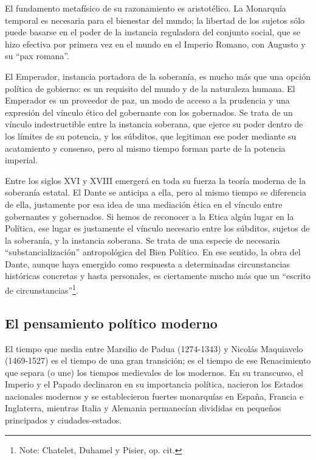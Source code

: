 \documentclass[
]{book}
\begin{document}
El fundamento metafísico de su razonamiento es aristotélico. La Monarquía temporal es necesaria para el bienestar del mundo; la libertad de los sujetos sólo puede basarse en el poder de la instancia reguladora del conjunto social, que se hizo efectiva por primera vez en el mundo en el Imperio Romano, con Augusto y su ``pax romana''.

El Emperador, instancia portadora de la soberanía, es mucho más que una opción política de gobierno: es un requisito del mundo y de la naturaleza humana. El Emperador es un proveedor de paz, un modo de acceso a la prudencia y una expresión del vínculo ético del gobernante con los gobernados. Se trata de un vínculo indestructible entre la instancia soberana, que ejerce su poder dentro de los límites de su potencia, y los súbditos, que legitiman ese poder mediante su acatamiento y consenso, pero al mismo tiempo forman parte de la potencia imperial.

Entre los siglos XVI y XVIII emergerá en toda su fuerza la teoría moderna de la soberanía estatal. El Dante se anticipa a ella, pero al mismo tiempo se diferencia de ella, justamente por esa idea de una mediación ética en el vínculo entre gobernantes y gobernados. Si hemos de reconocer a la Etica algún lugar en la Política, ese lugar es justamente el vínculo necesario entre los súbditos, sujetos de la soberanía, y la instancia soberana. Se trata de una especie de necesaria ``substancialización'' antropológica del Bien Político. En ese sentido, la obra del Dante, aunque haya emergido como respuesta a determinadas circunstancias históricas concretas y hasta personales, es ciertamente mucho más que un ``escrito de circunstancias''\footnote{Note: Chatelet, Duhamel y Pisier, op. cit.}.

\hypertarget{el-pensamiento-poluxedtico-moderno}{%
\subsection*{El pensamiento político moderno}\label{el-pensamiento-poluxedtico-moderno}}

El tiempo que media entre Marsilio de Padua (1274-1343) y Nicolás Maquiavelo (1469-1527) es el tiempo de una gran transición; es el tiempo de ese Renacimiento que separa (o une) los tiempos medievales de los modernos. En su transcurso, el Imperio y el Papado declinaron en su importancia política, nacieron los Estados nacionales modernos y se establecieron fuertes monarquías en España, Francia e Inglaterra, mientras Italia y Alemania permanecían divididas en pequeños principados y ciudades-estados.
\end{document}
